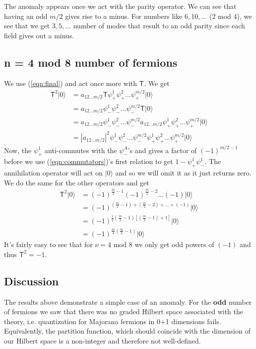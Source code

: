 \documentclass[12pt,a4paper]{article}
\begin{document}
The anomaly appears once we act with the parity operator. We can see that
having an odd $ m/2 $ gives rise to a minus. For numbers like $ 6,10, \dots $
(2 mod 4), we see that we get $ 3,5,\dots $ number of modes that result to an odd parity
since each field gives out a minus.

\subsection{n = 4 mod 8 number of fermions}
We use (\ref{eqn:final}) and act once more with $ \mathsf{T} $. We get
\begin{align*}
	\mathsf{T}^2 | 0 \rangle &= a _{ 12\dots m/2 } \mathsf{T} \psi _+^1 \psi _+^2 \dots \psi _+ ^{ m/2 } | 0 \rangle \\
	&= a _{ 12\dots m/2 } \psi _-^1 \psi _-^2 \dots \psi _- ^{ m/2 } \mathsf{T} | 0 \rangle\\
	&= a _{ 12\dots m/2 } \psi _-^1 \psi _-^2 \dots \psi _- ^{ m/2 } a _{ 12\dots m/2 } \psi _+^1 \psi _+^2 \dots \psi _+ ^{ m/2 } | 0 \rangle\\
	&= |a _{ 12\dots m/2 }|^2 \psi _-^1 \psi _-^2 \dots \psi _- ^{ m/2 } \psi _+^1 \psi _+^2 \dots \psi _+ ^{ m/2 } | 0 \rangle 
\end{align*}
Now, the $ \psi _+ ^1 $ anti-commutes with the $ \psi _-^A $'s and gives a factor of $ (-1) ^{ m/2-1 }  $ before we use (\ref{eqn:commutators})'s first relation to get $ 1 - \psi _+^1 \psi _-^1 $. The annihilation operator will act on $ | 0 \rangle  $ and so we will omit it as it just returns zero. We do the same for the other operators and get
\begin{align*}
	\mathsf{T}^2 | 0 \rangle &= (-1) ^{ \frac{ m }{ 2 } -1 } (-1) ^{ \frac{ m }{ 2 } -2 } \dots (-1) | 0 \rangle \\
	&= (-1) ^{ ( \frac{ m }{ 2 } -1)+( \frac{ m }{ 2 } -2 ) + \dots +(-1) } | 0 \rangle \\
	&= (-1) ^{ \frac{ 1 }{ 2 }  \left( \frac{ m }{ 2 } -1 \right) \left[ \left( \frac{ m }{ 2 } -1 \right) +1 \right] } | 0 \rangle \\
	&= (-1) ^{ \frac{ m }{ 4 } \left( \frac{ m }{ 2 } -1 \right)  } | 0 \rangle 
\end{align*}
It's fairly easy to see that for $ \nu = 4 \text{ mod } 8 $ we only get odd powers of $ (-1) $ and thus $ \mathsf{T}^2 = -1 $.
\subsection{Discussion}
The results above demonstrate a simple case of an anomaly. For the \textbf{odd}
number of fermions we saw that there was no graded Hilbert space associated
with the theory, i.e. quantization for Majorana fermions in 0+1 dimensions fails.
Equivalently, the partition function, which should coincide with the dimension
of our Hilbert space is a non-integer and therefore not well-defined.
\end{document}
